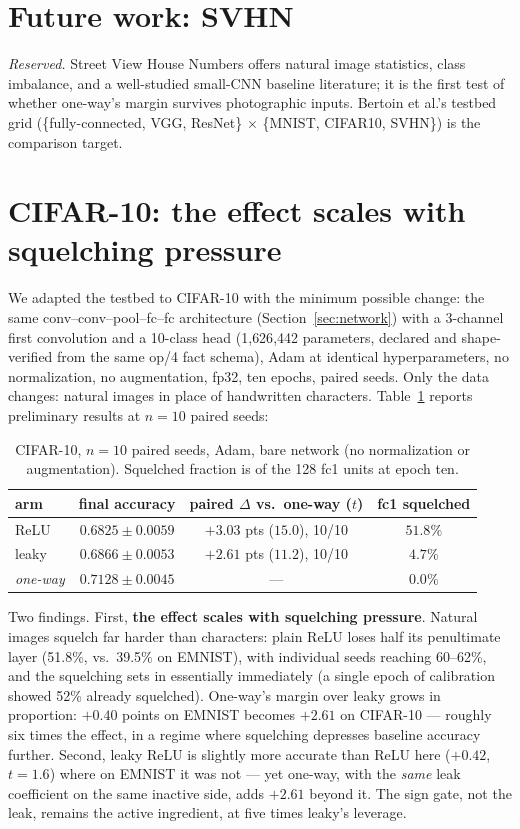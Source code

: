 \documentclass[11pt]{article}
\begin{document}
\section{Future work: SVHN}
\emph{Reserved.} Street View House Numbers offers natural image
statistics, class imbalance, and a well-studied small-CNN baseline
literature; it is the first test of whether one-way's margin survives
photographic inputs. Bertoin et al.'s testbed grid
(\{fully-connected, VGG, ResNet\} $\times$ \{MNIST, CIFAR10, SVHN\})
is the comparison target.

\section{CIFAR-10: the effect scales with squelching pressure}
\label{sec:cifar}

We adapted the testbed to CIFAR-10 with the minimum possible change:
the same conv--conv--pool--fc--fc architecture
(Section~\ref{sec:network}) with a 3-channel first convolution and a
10-class head (1{,}626{,}442 parameters, declared and
shape-verified from the same op/4 fact schema), Adam at identical
hyperparameters, no normalization, no augmentation, fp32, ten epochs,
paired seeds. Only the data changes: natural images in place of
handwritten characters. Table~\ref{tab:cifar} reports preliminary
results at $n{=}10$ paired seeds:

\begin{table}[H]
\centering
\caption{CIFAR-10, $n{=}10$ paired seeds, Adam, bare network
(no normalization or augmentation). Squelched fraction is of the 128
fc1 units at epoch ten.}
\label{tab:cifar}
\begin{tabular}{lccc}
\toprule
arm & final accuracy & paired $\Delta$ vs.\ one-way ($t$) & fc1 squelched \\
\midrule
ReLU    & $0.6825 \pm 0.0059$ & $+3.03$ pts ($15.0$), 10/10 & $51.8\%$ \\
leaky   & $0.6866 \pm 0.0053$ & $+2.61$ pts ($11.2$), 10/10 & $4.7\%$ \\
\emph{one-way} & $\mathbf{0.7128 \pm 0.0045}$ & --- & $0.0\%$ \\
\bottomrule
\end{tabular}
\end{table}

Two findings. First, \textbf{the effect scales with squelching
pressure}. Natural images squelch far harder than characters: plain
ReLU loses half its penultimate layer (51.8\%, vs.\ 39.5\% on
EMNIST), with individual seeds reaching 60--62\%, and the squelching
sets in essentially immediately (a single epoch of calibration showed
52\% already squelched). One-way's margin over leaky grows in proportion:
$+0.40$ points on EMNIST becomes $+2.61$ on CIFAR-10 --- roughly six
times the effect, in a regime where squelching depresses baseline accuracy further.
Second, leaky ReLU is slightly more accurate than ReLU here ($+0.42$,
$t{=}1.6$) where on EMNIST it was not --- yet one-way,
with the \emph{same} leak coefficient on the same inactive side,
adds $+2.61$ beyond it. The sign gate, not the leak, remains the
active ingredient, at five times leaky's leverage.
\end{document}
